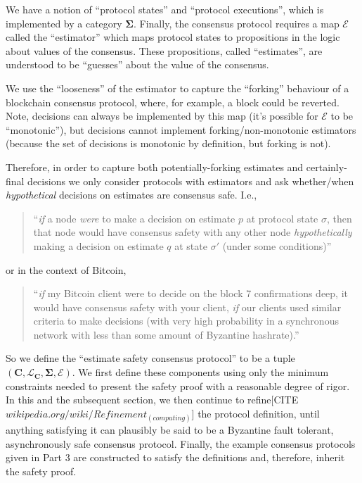 \documentclass{article}
\theoremstyle{definition}
\newcommand{\cat}{
	\mathbf
}
\begin{document}
We have a notion of ``protocol states'' and ``protocol executions'', which is implemented by a category $\cat{\Sigma}$. Finally, the consensus protocol requires a map $\mathcal{E}$ called the ``estimator'' which maps protocol states to propositions in the logic about values of the consensus. These propositions, called ``estimates'', are understood to be ``guesses'' about the value of the consensus.

We use the ``looseness'' of the estimator to capture the ``forking'' behaviour of a blockchain consensus protocol, where, for example, a block could be reverted. Note, decisions can always be implemented by this map (it's possible for $\mathcal{E}$ to be ``monotonic''), but decisions cannot implement forking/non-monotonic estimators (because the set of decisions is monotonic by definition, but forking is not).

Therefore, in order to capture both potentially-forking estimates and certainly-final decisions we only consider protocols with estimators and ask whether/when \emph{hypothetical} decisions on estimates are consensus safe. I.e.,

\begin{quote}
``\emph{if} a node \emph{were} to make a decision on estimate $p$ at protocol state $\sigma$, then that node would have consensus safety with any other node \emph{hypothetically} making a decision on estimate $q$ at state $\sigma'$ (under some conditions)''
\end{quote}

or in the context of Bitcoin,

\begin{quote}
``\emph{if} my Bitcoin client were to decide on the block 7 confirmations deep, it would have consensus safety with your client, \emph{if} our clients used similar criteria to make decisions (with very high probability in a synchronous network with less than some amount of Byzantine hashrate).''
\end{quote}

So we define the ``estimate safety consensus protocol'' to be a tuple $(\cat{C}, \mathcal{L}_\cat{C}, \cat{\Sigma}, \mathcal{E})$. We first define these components using only the minimum constraints needed to present the safety proof with a reasonable degree of rigor. In this and the subsequent section, we then continue to refine[CITE $wikipedia.org/wiki/Refinement_(computing)$] the protocol definition, until anything satisfying it can plausibly be said to be a Byzantine fault tolerant, asynchronously safe consensus protocol. Finally, the example consensus protocols given in Part 3 are constructed to satisfy the definitions and, therefore, inherit the safety proof.
\end{document}

